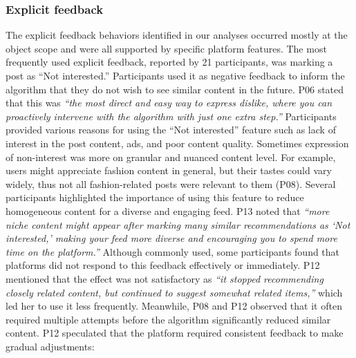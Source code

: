 \subsubsection{Explicit feedback}
The explicit feedback behaviors identified in our analyses occurred mostly at the object scope and were all supported by specific platform features. The most frequently used explicit feedback, reported by 21 participants, was marking a post as ``Not interested.'' Participants used it as negative feedback to inform the algorithm that they do not wish to see similar content in the future. P06 stated that this was \textit{``the most direct and easy way to express dislike, where you can proactively intervene with the algorithm with just one extra step.''} Participants provided various reasons for using the ``Not interested'' feature such as lack of interest in the post content, ads, and poor content quality. Sometimes expression of non-interest was more on granular and nuanced content level. For example, users might appreciate fashion content in general, but their tastes could vary widely, thus not all fashion-related posts were relevant to them (P08).
Several participants highlighted the importance of using this feature to reduce homogeneous content for a diverse and engaging feed. P13 noted that \textit{``more niche content might appear after marking many similar recommendations as `Not interested,' making your feed more diverse and encouraging you to spend more time on the platform.''}
Although commonly used, some participants found that platforms did not respond to this feedback effectively or immediately. P12 mentioned that the effect was not satisfactory as \textit{``it stopped recommending closely related content, but continued to suggest somewhat related items,''} which led her to use it less frequently. Meanwhile, P08 and P12 observed that it often required multiple attempts before the algorithm significantly reduced similar content. P12 speculated that the platform required consistent feedback to make gradual adjustments:
